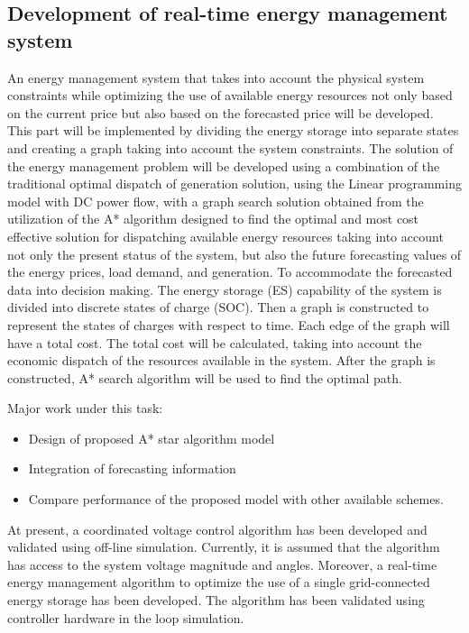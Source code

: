 \subsection{Development of real-time energy management system}
An energy management system that takes into account the physical system constraints while optimizing the use of available energy resources not only based on the current price but also based on the forecasted price will be developed. This part will be implemented by dividing the energy storage into separate states and creating a graph taking into account the system constraints. The solution of the energy management problem will be developed using a combination of the traditional optimal dispatch of generation solution, using the Linear programming model with DC power flow, with a graph search solution obtained from the utilization of the A* algorithm designed to find the optimal and most cost effective solution for dispatching available energy resources taking into account not only the present status of the system, but also the future forecasting values of the energy prices, load demand, and generation.
To accommodate the forecasted data into decision making. The energy storage (ES) capability of the system is divided into discrete states of charge (SOC). Then a graph is constructed to represent the states of charges with respect to time. Each edge of the graph will have a total cost. The total cost will be calculated, taking into account the economic dispatch of the resources available in the system. After the graph is constructed, A* search algorithm will be used to find the optimal path.

Major work under this task:
\begin{itemize}
    \item Design of proposed A* star algorithm model 
    \item Integration of forecasting information
    \item Compare performance of the proposed model with other available schemes.
\end{itemize}


At present, a coordinated voltage control algorithm has been developed and validated using off-line simulation. Currently, it is assumed that the algorithm has access to the system voltage magnitude and angles. Moreover, a real-time energy management algorithm to optimize the use of a single grid-connected energy storage has been developed. The algorithm has been validated using controller hardware in the loop simulation.